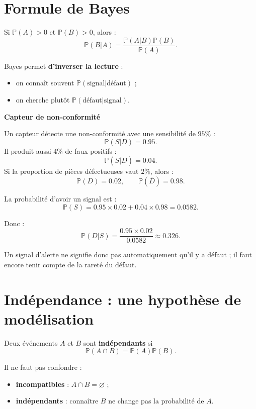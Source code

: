 \section{Formule de Bayes}

\begin{Prop}
Si $\mathbb{P}(A)>0$ et $\mathbb{P}(B)>0$, alors :
$$
\mathbb{P}(B|A)=\frac{\mathbb{P}(A|B)\mathbb{P}(B)}{\mathbb{P}(A)}.
$$
\end{Prop}

\begin{Rmq}
Bayes permet \textbf{d'inverser la lecture} :
\begin{itemize}
    \item on connaît souvent $\mathbb{P}(\text{signal}|\text{défaut})$ ;
    \item on cherche plutôt $\mathbb{P}(\text{défaut}|\text{signal})$.
\end{itemize}
\end{Rmq}

\begin{Ex}
\textbf{Capteur de non-conformité}

Un capteur détecte une non-conformité avec une sensibilité de $95\%$ :
$$
\mathbb{P}(S|D)=0.95.
$$
Il produit aussi $4\%$ de faux positifs :
$$
\mathbb{P}(S|\overline{D})=0.04.
$$
Si la proportion de pièces défectueuses vaut $2\%$, alors :
$$
\mathbb{P}(D)=0.02, \qquad \mathbb{P}(\overline{D})=0.98.
$$

La probabilité d'avoir un signal est :
$$
\mathbb{P}(S)=0.95\times 0.02 + 0.04\times 0.98 = 0.0582.
$$

Donc :
$$
\mathbb{P}(D|S)=\frac{0.95\times 0.02}{0.0582}\approx 0.326.
$$

Un signal d'alerte ne signifie donc pas automatiquement qu'il y a défaut ; il faut encore tenir compte de la rareté du défaut.
\end{Ex}

\section{Indépendance : une hypothèse de modélisation}

\begin{Def}
Deux événements $A$ et $B$ sont \textbf{indépendants} si
$$
\mathbb{P}(A\cap B)=\mathbb{P}(A)\mathbb{P}(B).
$$
\end{Def}

\begin{Rmq}
Il ne faut pas confondre :
\begin{itemize}
    \item \textbf{incompatibles} : $A\cap B=\varnothing$ ;
    \item \textbf{indépendants} : connaître $B$ ne change pas la probabilité de $A$.
\end{itemize}
\end{Rmq}

